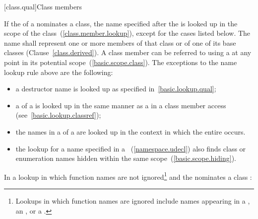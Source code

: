 [class.qual]{Class members}

\pnum
{}%
If the  of a 
nominates a class, the name specified after the
 is looked up in the scope of the
class~(\ref{class.member.lookup}), except for the cases listed below.
The name shall represent one or more members of that class or of one of
its base classes (Clause~\ref{class.derived}). \enternote A class member
can be referred to using a  at any point in its
potential scope~(\ref{basic.scope.class}). \exitnote The exceptions to
the name lookup rule above are the following:

\begin{itemize}
\item a destructor name is looked up as specified
in~\ref{basic.lookup.qual};

\item a  of a
 is looked up
in the same manner as a  in a class member
access (see~\ref{basic.lookup.classref});

\item the names in a  of a
 are looked up in the context in which the entire
 occurs.

\item the lookup for a name specified in a
~(\ref{namespace.udecl}) also finds class or
enumeration names hidden within the same
scope~(\ref{basic.scope.hiding}).

\end{itemize}

\pnum
In a lookup in which function names are not ignored\footnote{Lookups in which
function names are ignored include names appearing in a
, an
, or a .}
and the  nominates a class :

